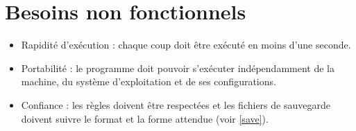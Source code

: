 \documentclass[10pt,a4paper]{article}
\begin{document}

\section{Besoins non fonctionnels}

\begin{itemize} 
\item Rapidité d'exécution : chaque coup doit être exécuté en moins d'une seconde.
\item Portabilité : le programme doit pouvoir s'exécuter indépendamment de la machine, du système d'exploitation et de ses configurations.
\item Confiance : les règles doivent être respectées et les fichiers de sauvegarde doivent suivre le format et la forme attendue (voir \ref{save}).
\end{itemize}
\end{document}
